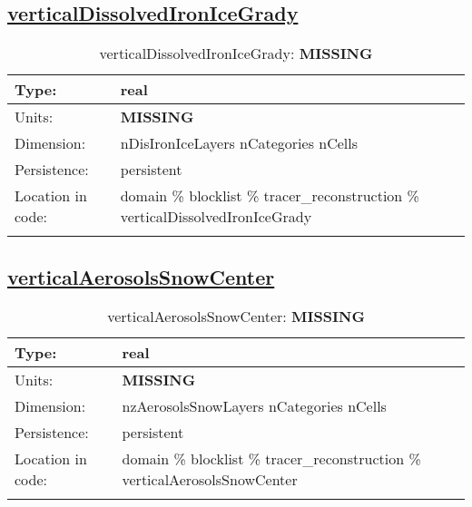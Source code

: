 \subsection[verticalDissolvedIronIceGrady]{\hyperref[sec:var_tab_tracer_reconstruction]{verticalDissolvedIronIceGrady}}
\label{subsec:var_sec_tracer_reconstruction_verticalDissolvedIronIceGrady}
\begin{center}
\begin{longtable}{| p{2.0in} | p{4.0in} |}
        \hline 
        Type: & real \\
        \hline 
        Units: & {\bf \color{red} MISSING} \\
        \hline 
        Dimension: & nDisIronIceLayers nCategories nCells \\
        \hline 
        Persistence: & persistent \\
        \hline 
         Location in code: & domain \% blocklist \% tracer\_reconstruction \% verticalDissolvedIronIceGrady \\
         \hline 
    \caption{verticalDissolvedIronIceGrady: {\bf \color{red} MISSING}}
\end{longtable}
\end{center}
\subsection[verticalAerosolsSnowCenter]{\hyperref[sec:var_tab_tracer_reconstruction]{verticalAerosolsSnowCenter}}
\label{subsec:var_sec_tracer_reconstruction_verticalAerosolsSnowCenter}
\begin{center}
\begin{longtable}{| p{2.0in} | p{4.0in} |}
        \hline 
        Type: & real \\
        \hline 
        Units: & {\bf \color{red} MISSING} \\
        \hline 
        Dimension: & nzAerosolsSnowLayers nCategories nCells \\
        \hline 
        Persistence: & persistent \\
        \hline 
         Location in code: & domain \% blocklist \% tracer\_reconstruction \% verticalAerosolsSnowCenter \\
         \hline 
    \caption{verticalAerosolsSnowCenter: {\bf \color{red} MISSING}}
\end{longtable}
\end{center}
